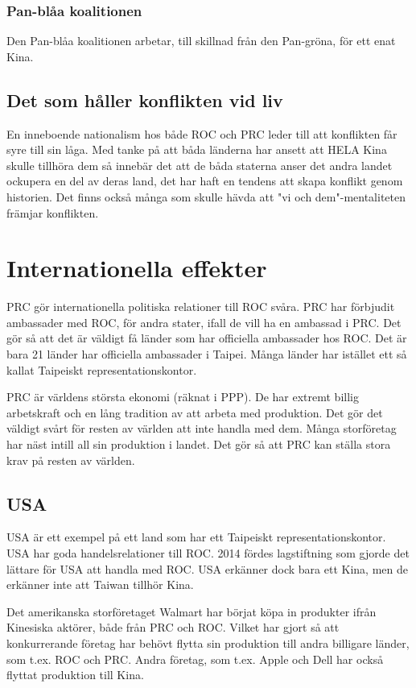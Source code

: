 \documentclass[a4paper,10pt]{article}
\begin{document}
\subsubsection*{Pan-blåa koalitionen}
Den Pan-blåa koalitionen arbetar, till skillnad från den Pan-gröna, för ett enat Kina.

\subsection*{Det som håller konflikten vid liv}
En inneboende nationalism hos både ROC och PRC leder till att konflikten får syre till sin låga. Med tanke på att båda länderna har ansett att HELA Kina skulle tillhöra dem så innebär det att de båda staterna anser det andra landet ockupera en del av deras land, det har haft en tendens att skapa konflikt genom historien. Det finns också många som skulle hävda att "vi och dem"-mentaliteten främjar konflikten.

\section*{Internationella effekter}
PRC gör internationella politiska relationer till ROC svåra. PRC har förbjudit ambassader med ROC, för andra stater, ifall de vill ha en ambassad i PRC. Det gör så att det är väldigt få länder som har officiella ambassader hos ROC. Det är bara 21 länder har officiella ambassader i Taipei. Många länder har istället ett så kallat Taipeiskt representationskontor. 

PRC är världens största ekonomi (räknat i PPP). De har extremt billig arbetskraft och en lång tradition av att arbeta med produktion. Det gör det väldigt svårt för resten av världen att inte handla med dem. Många storföretag har näst intill all sin produktion i landet. Det gör så att PRC kan ställa stora krav på resten av världen.

\subsection*{USA}
USA är ett exempel på ett land som har ett Taipeiskt representationskontor. USA har goda handelsrelationer till ROC. 2014 fördes lagstiftning som gjorde det lättare för USA att handla med ROC. USA erkänner dock bara ett Kina, men de erkänner inte att Taiwan tillhör Kina.

Det amerikanska storföretaget Walmart har börjat köpa in produkter ifrån Kinesiska aktörer, både från PRC och ROC. Vilket har gjort så att konkurrerande företag har behövt flytta sin produktion till andra billigare länder, som t.ex. ROC och PRC. Andra företag, som t.ex. Apple och Dell har också flyttat produktion till Kina.
\end{document}

